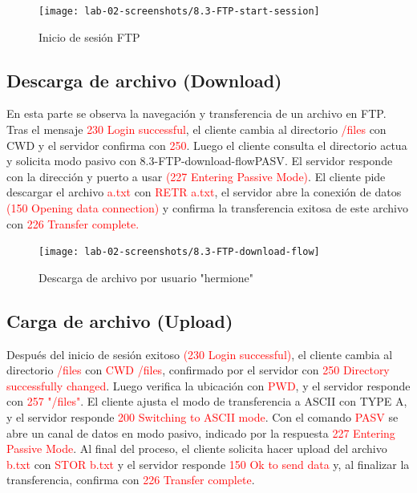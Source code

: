 \documentclass[10pt]{article}
\begin{document}
\begin{figure}[H]
    \centering
    \texttt{[image: lab-02-screenshots/8.3-FTP-start-session]}
    \caption{Inicio de sesión FTP}
\end{figure}

\subsection{Descarga de archivo (Download)}
En esta parte se observa la navegación y transferencia de un archivo en FTP. Tras el mensaje \textcolor{red}{230 Login successful}, el cliente cambia al directorio \textcolor{red}{/files} con CWD y el servidor confirma con \textcolor{red}{250}. Luego el cliente consulta el directorio actua y solicita modo pasivo con 8.3-FTP-download-flow{PASV}. El servidor responde con la dirección y puerto a usar \textcolor{red}{(227 Entering Passive Mode)}. El cliente pide descargar el archivo \textcolor{red}{a.txt} con \textcolor{red}{RETR a.txt}, el servidor abre la conexión de datos \textcolor{red}{(150 Opening data connection)} y confirma la transferencia exitosa de este archivo con \textcolor{red}{226 Transfer complete.}

\begin{figure}[H]
    \centering
    \texttt{[image: lab-02-screenshots/8.3-FTP-download-flow]}
    \caption{Descarga de archivo por usuario "hermione"}
\end{figure}

\subsection{Carga de archivo (Upload)}
Después del inicio de sesión exitoso \textcolor{red}{(230 Login successful)}, el cliente cambia al directorio \textcolor{red}{/files} con \textcolor{red}{CWD /files}, confirmado por el servidor con \textcolor{red}{250 Directory successfully changed}. Luego verifica la ubicación con \textcolor{red}{PWD}, y el servidor responde con \textcolor{red}{257 "/files"}. El cliente ajusta el modo de transferencia a ASCII con TYPE A, y el servidor responde \textcolor{red}{200 Switching to ASCII mode}. Con el comando \textcolor{red}{PASV} se abre un canal de datos en modo pasivo, indicado por la respuesta \textcolor{red}{227 Entering Passive Mode}. Al final del proceso, el cliente solicita hacer upload del archivo \textcolor{red}{b.txt} con \textcolor{red}{STOR b.txt} y el servidor responde \textcolor{red}{150 Ok to send data} y, al finalizar la transferencia, confirma con \textcolor{red}{226 Transfer complete}.
\end{document}
